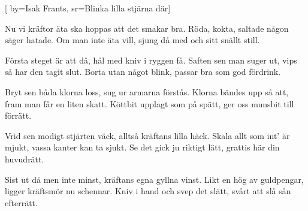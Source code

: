 [ 		
	by={Isak Frants},		
	sr={Blinka lilla stjärna där}]										

	
\beginverse*						
Nu vi kräftor äta ska
hoppas att det smakar bra.
Röda, kokta, saltade
någon säger hatade.
Om man inte äta vill,
sjung då med och sitt snällt still. 
\endverse						

\beginverse				
Första steget är att då,
hål med kniv i ryggen få.
Saften sen man suger ut,
vips så har den tagit slut.
Borta utan något blink,
passar bra som god fördrink.
\endverse				

\beginverse				
Bryt sen båda klorna loss,
sug ur armarna förstås.
Klorna bändes upp så att, 
fram man får en liten skatt.
Köttbit upplagt som på spätt,
ger oss munsbit till förrätt.
\endverse				

\beginverse				
Vrid sen modigt stjärten väck,
alltså kräftans lilla häck. 
Skala allt som int' är mjukt,
vassa kanter kan ta sjukt.
Se det gick ju riktigt lätt,
grattis här din huvudrätt.
\endverse				

\beginverse				
Sist ut då men inte minst,
kräftans egna gyllna vinst.
Likt en hög av guldpengar,
ligger kräftsmör nu schennar. 
Kniv i hand och svep det slätt,
svårt att slå sån efterrätt.
\endverse				
\endsong	
